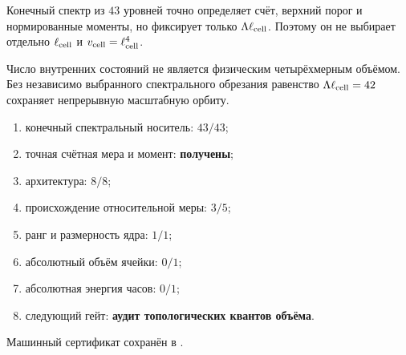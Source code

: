 \begin{theorem}
Конечный спектр из $43$ уровней точно определяет счёт, верхний порог и
нормированные моменты, но фиксирует только $\Lambda\ell_{\rm cell}$. Поэтому
он не выбирает отдельно $\ell_{\rm cell}$ и
$v_{\rm cell}=\ell_{\rm cell}^4$.
\end{theorem}

\begin{nogocriterion}
Число внутренних состояний не является физическим четырёхмерным объёмом.
Без независимо выбранного спектрального обрезания равенство
$\Lambda\ell_{\rm cell}=42$ сохраняет непрерывную масштабную орбиту.
\end{nogocriterion}

\begin{protocol}\begin{enumerate}
\item конечный спектральный носитель: \textbf{$43/43$};
\item точная счётная мера и момент: \textbf{получены};
\item архитектура: \textbf{$8/8$};
\item происхождение относительной меры: \textbf{$3/5$};
\item ранг и размерность ядра: \textbf{$1/1$};
\item абсолютный объём ячейки: \textbf{$0/1$};
\item абсолютная энергия часов: \textbf{$0/1$};
\item следующий гейт: \textbf{аудит топологических квантов объёма}.
\end{enumerate}\end{protocol}

Машинный сертификат сохранён в
.